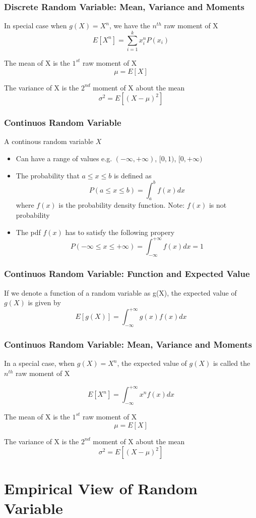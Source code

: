 \documentclass[notheorems, aspectratio=54]{beamer}
\begin{document}
\begin{frame}
\frametitle{Discrete Random Variable: Mean, Variance and Moments}

In special case when $g(X)=X^{n}$, we have the $n^{th}$ raw moment of X
$$E[X^{n}]=\sum_{i=1}^{k} x_{i}^{n} P(x_i)$$

The mean of X is the $1^{st}$ raw moment of X 
$$\mu=E[X]$$
 
The variance of X is the $2^{nd}$ moment of X about the mean  $$\sigma^{2}=E[(X-\mu)^{2}]$$


\end{frame}
\begin{frame}
\frametitle{Continuos Random Variable}

A continous random variable $X$
\begin{itemize}
\item Can have a range of values e.g. $(-\infty, +\infty)$, $[0, 1)$, $[0, +\infty)$
\item The probability that $a\leq x \leq b$ is defined as $$P(a\leq x \leq b) = \int_{a}^{b} f(x) dx$$ 
where $f(x)$ is the probability density function. Note: $f(x)$ is not probability
\item The pdf $f(x)$ has to satisfy the following propery $$P(-\infty \leq x \leq +\infty) = \int_{-\infty }^{+\infty }f(x)dx=1$$
\end{itemize}

\end{frame}

\begin{frame}
\frametitle{Continuos Random Variable: Function and Expected Value}
If we denote a function of a random variable as g(X), the expected value of $g(X)$ is given by
$$E[g(X)]=\int_{-\infty }^{+\infty }g(x)f(x)dx$$

\end{frame}

\begin{frame}
\frametitle{Continuos Random Variable: Mean, Variance and Moments}
In a special case, when $g(X)=X^{n}$, the expected value of $g(X)$ is called the $n^{th}$ raw moment of X

$$E[X^{n}]=\int_{-\infty }^{+\infty }x^{n}f(x)dx$$

The mean of X is the $1^{st}$ raw moment of X 
$$\mu=E[X]$$
 
The variance of X is the $2^{nd}$ moment of X about the mean  $$\sigma^{2}=E[(X-\mu)^{2}]$$

\end{frame}
\section{Empirical View of Random Variable}
\end{document}
